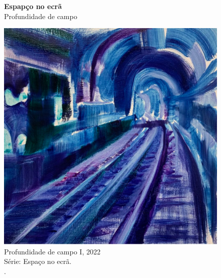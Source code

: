 \begin{figure}
  \caption[Espaço no ecrã: Profundidade de campo]{\textbf{Espapço no ecrã} \\ Profundidade de campo}
  \begin{minipage}[b]{.7\linewidth}
	\includegraphics[width = \linewidth]{apendice/pinturas-finalizadas/boudet-profundidade-i.pdf}
  \caption*{Profundidade de campo I, 2022 \\ Série: Espaço no ecrã. \\ \oleolinho. }
\end{minipage}

\vspace{2em}


\end{figure}
